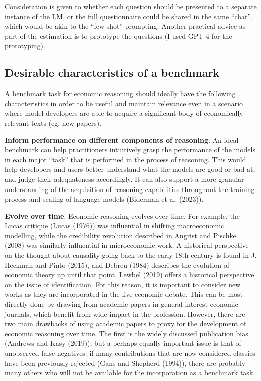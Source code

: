 \documentclass[
]{article}
\begin{document}
Consideration is given to whether each question should be presented to a
separate instance of the LM, or the full questionnaire could be shared
in the same ``chat'', which would be akin to the ``few-shot'' prompting.
Another practical advice as part of the estimation is to prototype the
questions (I used GPT-4 for the prototyping).

\subsection{Desirable characteristics of a
benchmark}\label{desirable-characteristics-of-a-benchmark}

A benchmark task for economic reasoning should ideally have the
following characteristics in order to be useful and maintain relevance
even in a scenario where model developers are able to acquire a
significant body of economically relevant texts (eg, new papers).

\textbf{Inform performance on different components of reasoning}: An
ideal benchmark can help practitioners intuitively grasp the performance
of the models in each major ``task'' that is performed in the process of
reasoning. This would help developers and users better understand what
the models are good or bad at, and judge their adequateness accordingly.
It can also support a more granular understanding of the acquisition of
reasoning capabilities throughout the training process and scaling of
language models (Biderman et al. (2023)).

\textbf{Evolve over time}: Economic reasoning evolves over time. For
example, the Lucas critique (Lucas (1976)) was influential in shifting
macroeconomic modelling, while the credibility revolution described in
Angrist and Pischke (2008) was similarly influential in microeconomic
work. A historical perspective on the thought about causality going back
to the early 18th century is found in J. Heckman and Pinto (2015), and
Debreu (1984) describes the evolution of economic theory up until that
point. Lewbel (2019) offers a historical perspective on the issue of
identification. For this reason, it is important to consider new works
as they are incorporated in the live economic debate. This can be most
directly done by drawing from academic papers in general interest
economic journals, which benefit from wide impact in the profession.
However, there are two main drawbacks of using academic papers to proxy
for the development of economic reasoning over time. The first is the
widely discussed publication bias (Andrews and Kasy (2019)), but a
perhaps equally important issue is that of unobserved false negatives:
if many contributions that are now considered classics have been
previously rejected (Gans and Shepherd (1994)), there are probably many
others who will not be available for the incorporation as a benchmark
task.
\end{document}
